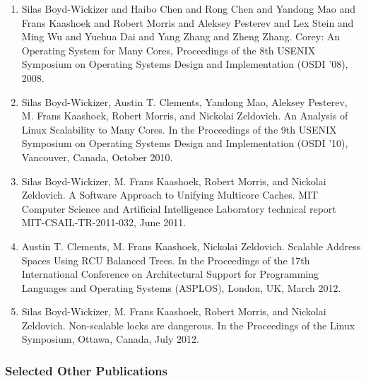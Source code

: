 \documentclass{article}
\begin{document}
\begin{enumerate}

\item Silas Boyd-Wickizer and Haibo Chen and Rong Chen and Yandong Mao and Frans
  Kaashoek and Robert Morris and Aleksey Pesterev and Lex Stein and Ming Wu and
  Yuehua Dai and Yang Zhang and Zheng Zhang.  Corey: An Operating System for
  Many Cores, Proceedings of the 8th {USENIX} {S}ymposium on {O}perating
  {S}ystems {D}esign and {I}mplementation ({OSDI} '08), 2008.

\item Silas Boyd-Wickizer, Austin T. Clements, Yandong Mao, Aleksey Pesterev,
  M. Frans Kaashoek, Robert Morris, and Nickolai Zeldovich. An Analysis of Linux
  Scalability to Many Cores. In the Proceedings of the 9th USENIX Symposium on
  Operating Systems Design and Implementation (OSDI '10), Vancouver, Canada,
  October 2010.

\item Silas Boyd-Wickizer, M. Frans Kaashoek, Robert Morris, and Nickolai
  Zeldovich. A Software Approach to Unifying Multicore Caches. MIT Computer
  Science and Artificial Intelligence Laboratory technical report
  MIT-CSAIL-TR-2011-032, June 2011.

\item Austin T. Clements, M. Frans Kaashoek, Nickolai Zeldovich.  Scalable
  Address Spaces Using RCU Balanced Trees. In the Proceedings of the 17th
  International Conference on Architectural Support for Programming Languages
  and Operating Systems (ASPLOS), London, UK, March 2012.

\item Silas Boyd-Wickizer, M. Frans Kaashoek, Robert Morris, and Nickolai
  Zeldovich. Non-scalable locks are dangerous. In the Proceedings of the Linux
  Symposium, Ottawa, Canada, July 2012.

\end{enumerate}

\subsubsection*{Selected Other Publications}
\end{document}
